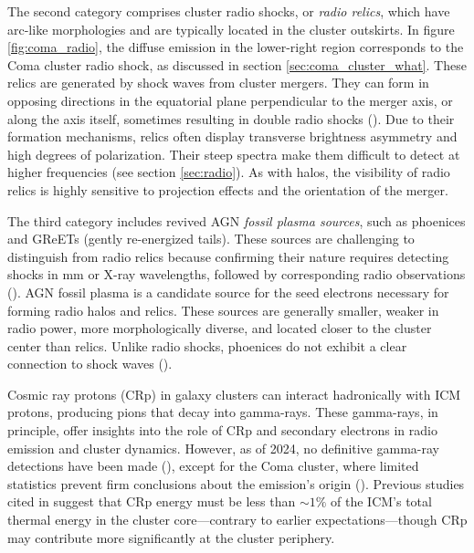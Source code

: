 \documentclass[11pt,letterpaper]{article}
\begin{document}
\medskip
\par The second category comprises cluster radio shocks, or \textit{radio relics}, which have arc-like morphologies and are typically located in the cluster outskirts. In figure \ref{fig:coma_radio}, the diffuse emission in the lower-right region corresponds to the Coma cluster radio shock, as discussed in section \ref{sec:coma_cluster_what}. These relics are generated by shock waves from cluster mergers. They can form in opposing directions in the equatorial plane perpendicular to the merger axis, or along the axis itself, sometimes resulting in double radio shocks (\cite{van_weeren_diffuse_2019}). Due to their formation mechanisms, relics often display transverse brightness asymmetry and high degrees of polarization. Their steep spectra make them difficult to detect at higher frequencies (see section \ref{sec:radio}). As with halos, the visibility of radio relics is highly sensitive to projection effects and the orientation of the merger.

\medskip
\par The third category includes revived AGN \textit{fossil plasma sources}, such as phoenices and GReETs (gently re-energized tails). These sources are challenging to distinguish from radio relics because confirming their nature requires detecting shocks in mm or X-ray wavelengths, followed by corresponding radio observations (\cite{van_weeren_diffuse_2019}). AGN fossil plasma is a candidate source for the seed electrons necessary for forming radio halos and relics. These sources are generally smaller, weaker in radio power, more morphologically diverse, and located closer to the cluster center than relics. Unlike radio shocks, phoenices do not exhibit a clear connection to shock waves (\cite{van_weeren_diffuse_2019}).

\medskip
\par Cosmic ray protons (CRp) in galaxy clusters can interact hadronically with ICM protons, producing pions that decay into gamma-rays. These gamma-rays, in principle, offer insights into the role of CRp and secondary electrons in radio emission and cluster dynamics. However, as of 2024, no definitive gamma-ray detections have been made (\cite{osinga_probing_2024}), except for the Coma cluster, where limited statistics prevent firm conclusions about the emission’s origin (\cite{baghmanyan_detailed_2022}). Previous studies cited in \cite{brunetti_cosmic_2014} suggest that CRp energy must be less than $\sim 1\%$ of the ICM’s total thermal energy in the cluster core—contrary to earlier expectations—though CRp may contribute more significantly at the cluster periphery.
\end{document}
